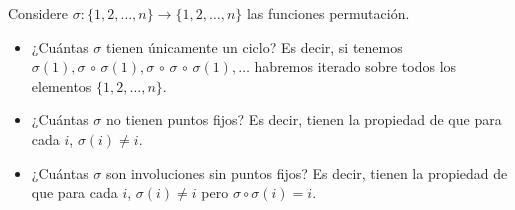 \begin{statement}{22}
  Considere $\sigma: \{1, 2, \dots, n\} \to \{1, 2, \dots, n\}$ las funciones
  permutaci\'on.
  \begin{itemize}
    \item ¿Cu\'antas $\sigma$ tienen \'unicamente un ciclo? Es decir, si
    tenemos $\sigma(1), \sigma\, \circ\, \sigma(1), \sigma\, \circ\, \sigma\, \circ\,
    \sigma(1), \dots$ habremos iterado sobre todos los elementos
    $\{1, 2, \dots, n\}$.
    \item ¿Cu\'antas $\sigma$ no tienen puntos fijos? Es decir, tienen la
    propiedad de que para cada $i$, $\sigma(i) \neq i$.
    \item ¿Cu\'antas $\sigma$ son involuciones sin puntos fijos? Es decir, tienen
    la propiedad de que para cada $i$, $\sigma(i) \neq i$ pero $\sigma \circ \sigma(i) = i$.
  \end{itemize}
\end{statement}